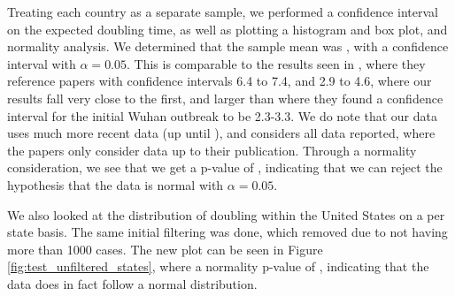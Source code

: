 Treating each country as a separate sample, we performed a confidence interval on the expected doubling time, as well as plotting a histogram and box plot, and normality analysis.
We determined that the sample mean was , with a confidence interval  with $\alpha=0.05$. 
This is comparable to the results seen in \cite{systemic_review}, where they reference papers with confidence intervals 6.4 to 7.4, and 2.9 to 4.6, where our results fall very close to the first, and larger than \cite{high_contagiousness} where they found a confidence interval for the initial Wuhan outbreak to be 2.3-3.3.
We do note that our data uses much more recent data (up until ), and considers all data reported, where the papers only consider data up to their publication.
Through a normality consideration, we see that we get a p-value of , indicating that we can reject the hypothesis that the data is normal with $\alpha=0.05$. 





\if{}
We also looked at the distribution of doubling within the United States on a per state basis. The same initial filtering was done, which removed  due to not having more than 1000 cases.
The new plot can be seen in Figure \ref{fig:test_unfiltered_states}, where a normality p-value of , indicating that the data does in fact follow a normal distribution.
\fi
